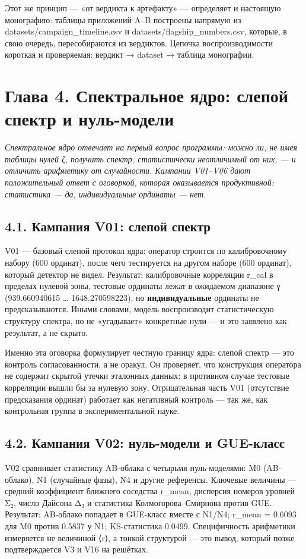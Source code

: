 \documentclass[11pt,a4paper]{article}
\begin{document}
Этот же принцип — «от вердикта к артефакту» — определяет и настоящую монографию: таблицы приложений A–B построены напрямую из datasets/campaign\_timeline.csv и datasets/flagship\_numbers.csv, которые, в свою очередь, пересобираются из вердиктов. Цепочка воспроизводимости короткая и проверяемая: вердикт → dataset → таблица монографии.

\section{Глава 4. Спектральное ядро: слепой спектр и нуль-модели}

\noindent\textit{\color{copper}Спектральное ядро отвечает на первый вопрос программы: можно ли, не имея таблицы нулей ζ, получить спектр, статистически неотличимый от них, — и отличить арифметику от случайности. Кампании V01–V06 дают положительный ответ с оговоркой, которая оказывается продуктивной: статистика — да, индивидуальные ординаты — нет.}

\subsection{4.1. Кампания V01: слепой спектр}

V01 — базовый слепой протокол ядра: оператор строится по калибровочному набору (600 ординат), после чего тестируется на другом наборе (600 ординат), который детектор не видел. Результат: калибровочные корреляции r\_cal в пределах нулевой зоны, тестовые ординаты лежат в ожидаемом диапазоне γ (939.660940615 … 1648.270598223), но \textbf{индивидуальные} ординаты не предсказываются. Иными словами, модель воспроизводит статистическую структуру спектра, но не «угадывает» конкретные нули — и это заявлено как результат, а не скрыто.

Именно эта оговорка формулирует честную границу ядра: слепой спектр — это контроль согласованности, а не оракул. Он проверяет, что конструкция оператора не содержит скрытой утечки эталонных данных: в противном случае тестовые корреляции вышли бы за нулевую зону. Отрицательная часть V01 (отсутствие предсказания ординат) работает как негативный контроль — так же, как контрольная группа в экспериментальной науке.

\subsection{4.2. Кампания V02: нуль-модели и GUE-класс}

V02 сравнивает статистику AB-облака с четырьмя нуль-моделями: M0 (AB-облако), N1 (случайные фазы), N4 и другие референсы. Ключевые величины — средний коэффициент ближнего соседства r\_mean, дисперсия номеров уровней Σ₂, число Дайсона Δ₃ и статистика Колмогорова–Смирнова против GUE. Результат: AB-облако попадает в GUE-класс вместе с N1/N4; r\_mean = 0.6093 для M0 против 0.5837 у N1; KS-статистика 0.0499. Специфичность арифметики измеряется не величиной ⟨r⟩, а тонкой структурой — это вывод, который позже подтверждается V3 и V16 на решётках.
\end{document}
